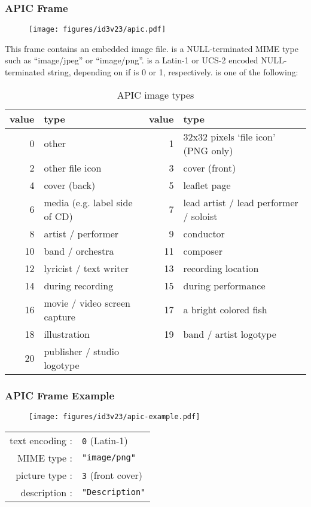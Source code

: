 \subsubsection{APIC Frame}
\begin{figure}[h]
\texttt{[image: figures/id3v23/apic.pdf]}
\end{figure}
\par
\noindent
This frame contains an embedded image file.
 is a NULL-terminated MIME type such as ``image/jpeg''
or ``image/png''.
 is a Latin-1 or UCS-2 encoded NULL-terminated string,
depending on if  is 0 or 1, respectively.
 is one of the following:
\begin{table}[h]
{
\begin{tabular}{|r|l||r|l|}
\hline
value & type & value & type \\
\hline
0 & other & 1 & 32x32 pixels `file icon' (PNG only) \\
2 & other file icon & 3 & cover (front) \\
4 & cover (back) & 5 & leaflet page \\
6 & media (e.g. label side of CD) & 7 & lead artist / lead performer / soloist \\
8 & artist / performer & 9 & conductor \\
10 & band / orchestra & 11 & composer \\
12 & lyricist / text writer & 13 & recording location \\
14 & during recording & 15 & during performance \\
16 & movie / video screen capture & 17 & a bright colored fish \\
18 & illustration & 19 & band / artist logotype \\
20 & publisher / studio logotype & &  \\
\hline
\end{tabular}
\caption{APIC image types}
}
\end{table}

\clearpage

\subsubsection{APIC Frame Example}
\begin{figure}[h]
  \texttt{[image: figures/id3v23/apic-example.pdf]}
\end{figure}
\begin{table}[h]
\begin{tabular}{rl}
text encoding : & \texttt{0} (Latin-1) \\
MIME type : & \texttt{"image/png"} \\
picture type : & \texttt{3} (front cover) \\
description : & \texttt{"Description"} \\
\end{tabular}
\end{table}

